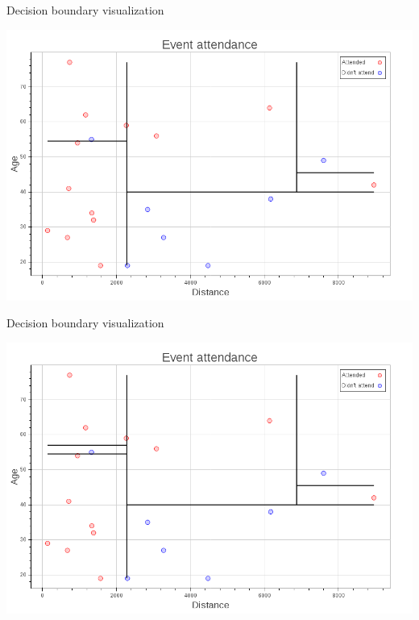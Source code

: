 \begin{frame}[fragile]{Decision boundary visualization}
    \begin{center}
        \includegraphics[scale=.25]{images/decision_tree_plot_5}
    \end{center}
\end{frame}

\begin{frame}[fragile]{Decision boundary visualization}
    \begin{center}
        \includegraphics[scale=.25]{images/decision_tree_plot_6}
    \end{center}
\end{frame}



